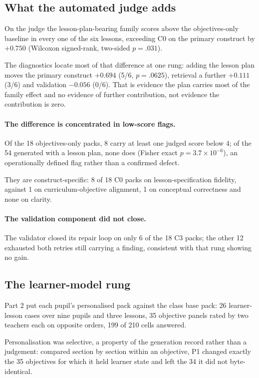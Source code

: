 \documentclass{article}
\begin{document}
\subsection{What the automated judge adds}


On the judge the lesson-plan-bearing family scores above the objectives-only baseline in every
one of the six lessons, exceeding C0 on the primary construct by $+0.750$ (Wilcoxon signed-rank,
two-sided $p=.031$).

The diagnostics locate most of that difference at one rung: adding the lesson plan moves the
primary construct $+0.694$ (5/6, $p=.0625$), retrieval a further $+0.111$ (3/6) and validation
$-0.056$ (0/6). That is evidence the plan carries most of the family effect and no evidence of
further contribution, not evidence the contribution is zero.



\paragraph{The difference is concentrated in low-score flags.}
Of the 18 objectives-only packs, 8 carry at least one judged
score below 4; of the 54 generated with a lesson plan, none does (Fisher exact
$p = 3.7 \times 10^{-6}$), an operationally defined flag rather than a confirmed defect.

They are construct-specific: 8 of 18 C0 packs on lesson-specification fidelity, against 1 on
curriculum-objective alignment, 1 on conceptual correctness and none on clarity.

\paragraph{The validation component did not close.}
The validator closed its repair loop on only 6 of the 18 C3 packs; the other 12 exhausted both
retries still carrying a finding, consistent with that rung showing no gain.

\subsection{The learner-model rung}
\label{sec:h2}

Part 2 put each pupil's personalised pack against the class base pack: 26 learner-lesson cases
over nine pupils and three lessons, 35 objective panels rated by two teachers each on opposite
orders, 199 of 210 cells answered.

Personalisation was selective, a property of the generation record rather than a judgement:
compared section by section within an objective, P1 changed exactly the 35
objectives for which it held learner state and left the 34 it did not byte-identical.
\end{document}
